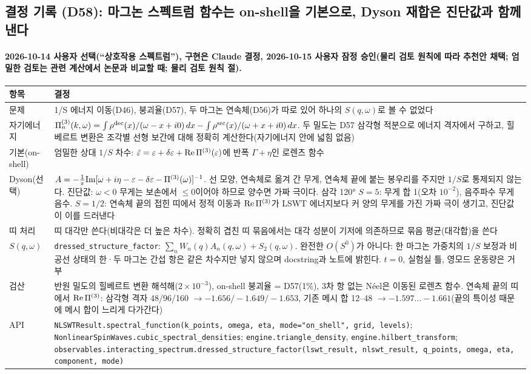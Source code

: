 \subsection{결정 기록 (D58): 마그논 스펙트럼 함수는 on-shell을 기본으로, Dyson 재합은 진단값과 함께 낸다}\label{decisions-d58-spectral}
\begingroup%
  \framesubtitle{2026-10-14 사용자 선택(``상호작용 스펙트럼''), 구현은 Claude 결정, 2026-10-15 사용자 잠정 승인(물리 검토 원칙에 따라 추천안 채택; 엄밀한 검토는 관련 계산에서 논문과 비교할 때; 물리 검토 원칙 절).}
  \small\renewcommand{\arraystretch}{1.12}
  \begin{tabularx}{\textwidth}{@{}P{3.0cm}Y@{}}
    \toprule
    항목 & 결정 \\
    \midrule
    문제 & 1/S 에너지 이동(D46), 붕괴율(D57), 두 마그논 연속체(D56)가 따로 있어 하나의 $S(q,\omega)$로 볼 수 없었다 \\
    자기에너지 & $\Pi^{(3)}_n(k,\omega)=\int\rho^{\rm dec}(x)/(\omega-x+i0)\,dx-\int\rho^{\rm src}(x)/(\omega+x+i0)\,dx$. 두 밀도는 D57 삼각형 적분으로 에너지 격자에서 구하고, 힐베르트 변환은 조각별 선형 보간에 대해 정확히 계산한다(자기에너지 안에 넓힘 없음) \\
    기본(on-shell) & 엄밀한 상대 $1/S$ 차수: $\tilde\varepsilon=\varepsilon+\delta\varepsilon+{\rm Re}\,\Pi^{(3)}(\varepsilon)$에 반폭 $\Gamma+\eta$인 로렌츠 함수 \\
    Dyson(선택) & $A=-\frac1\pi{\rm Im}[\omega+i\eta-\varepsilon-\delta\varepsilon-\Pi^{(3)}(\omega)]^{-1}$. 선 모양, 연속체로 옮겨 간 무게, 연속체 끝에 붙는 봉우리를 주지만 $1/S$로 통제되지 않는다. 진단값: $\omega<0$ 무게는 보손에서 $\le0$이어야 하므로 양수면 가짜 극이다. 삼각 120° $S=5$: 무게 합 1(오차 $10^{-2}$), 음주파수 무게 음수. $S=1/2$: 연속체 끝의 접힌 띠에서 정적 이동과 ${\rm Re}\,\Pi^{(3)}$가 LSWT 에너지보다 커 양의 무게를 가진 가짜 극이 생기고, 진단값이 이를 드러낸다 \\
    띠 처리 & 띠 대각만 쓴다(비대각은 더 높은 차수). 정확히 겹친 띠 묶음에서는 대각 성분이 기저에 의존하므로 묶음 평균(대각합)을 쓴다 \\
    $S(q,\omega)$ & \texttt{dressed\_structure\_factor}: $\sum_nW_n(q)A_n(q,\omega)+S_2(q,\omega)$. 완전한 $O(S^0)$가 아니다: 한 마그논 가중치의 $1/S$ 보정과 비공선 상태의 한·두 마그논 간섭 항은 같은 차수지만 넣지 않으며 docstring과 노트에 밝힌다. $t=0$, 실험실 틀, 영모드 운동량은 거부 \\
    검산 & 반원 밀도의 힐베르트 변환 해석해($2\times10^{-3}$), on-shell 붕괴율 = D57(1\%), 3차 항 없는 Néel은 이동된 로렌츠 함수. 연속체 끝의 띠에서 ${\rm Re}\,\Pi^{(3)}$: 삼각형 격자 48/96/160 $\to-1.656/-1.649/-1.653$, 기존 메시 합 12--48 $\to-1.597\dots-1.661$(끝의 특이성 때문에 메시 합이 느리게 다가간다) \\
    API & \texttt{NLSWTResult.spectral\_function(k\_points, omega, eta, mode="on\_shell", grid, levels)}; \texttt{NonlinearSpinWaves.cubic\_spectral\_densities}; \texttt{engine.triangle\_density}, \texttt{engine.hilbert\_transform}; \texttt{observables.interacting\_spectrum.dressed\_structure\_factor(lswt\_result, nlswt\_result, q\_points, omega, eta, component, mode)} \\
    \bottomrule
  \end{tabularx}
